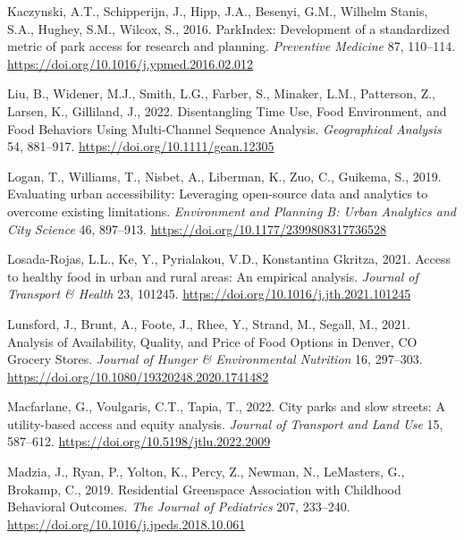 \documentclass[
  letterpaper,
  DIV=11,
  numbers=noendperiod]{scrreport}
\newlength{\cslhangindent}
\newlength{\cslentryspacingunit} %
\newenvironment{CSLReferences}[2] %
 {%
  \setlength{\parindent}{0pt}
  \ifodd #1
  \let\oldpar\par
  \def\par{\hangindent=\cslhangindent\oldpar}
  \fi
  \setlength{\parskip}{#2\cslentryspacingunit}
 }%
 {}
\begin{document}
\begin{CSLReferences}{1}{0}
\leavevmode{}%
Kaczynski, A.T., Schipperijn, J., Hipp, J.A., Besenyi, G.M., Wilhelm
Stanis, S.A., Hughey, S.M., Wilcox, S., 2016. {ParkIndex}: {Development}
of a standardized metric of park access for research and planning.
\emph{Preventive Medicine} 87, 110--114.
\url{https://doi.org/10.1016/j.ypmed.2016.02.012}

\leavevmode{}%
Liu, B., Widener, M.J., Smith, L.G., Farber, S., Minaker, L.M.,
Patterson, Z., Larsen, K., Gilliland, J., 2022. Disentangling {Time
Use}, {Food Environment}, and {Food Behaviors Using Multi-Channel
Sequence Analysis}. \emph{Geographical Analysis} 54, 881--917.
\url{https://doi.org/10.1111/gean.12305}

\leavevmode{}%
Logan, T., Williams, T., Nisbet, A., Liberman, K., Zuo, C., Guikema, S.,
2019. Evaluating urban accessibility: Leveraging open-source data and
analytics to overcome existing limitations. \emph{Environment and
Planning B: Urban Analytics and City Science} 46, 897--913.
\url{https://doi.org/10.1177/2399808317736528}

\leavevmode{}%
Losada-Rojas, L.L., Ke, Y., Pyrialakou, V.D., Konstantina Gkritza, 2021.
Access to healthy food in urban and rural areas: {An} empirical
analysis. \emph{Journal of Transport \& Health} 23, 101245.
\url{https://doi.org/10.1016/j.jth.2021.101245}

\leavevmode{}%
Lunsford, J., Brunt, A., Foote, J., Rhee, Y., Strand, M., Segall, M.,
2021. Analysis of {Availability}, {Quality}, and {Price} of {Food
Options} in {Denver}, {CO Grocery Stores}. \emph{Journal of Hunger \&
Environmental Nutrition} 16, 297--303.
\url{https://doi.org/10.1080/19320248.2020.1741482}

\leavevmode{}%
Macfarlane, G., Voulgaris, C.T., Tapia, T., 2022. City parks and slow
streets: {A} utility-based access and equity analysis. \emph{Journal of
Transport and Land Use} 15, 587--612.
\url{https://doi.org/10.5198/jtlu.2022.2009}

\leavevmode{}%
Madzia, J., Ryan, P., Yolton, K., Percy, Z., Newman, N., LeMasters, G.,
Brokamp, C., 2019. Residential {Greenspace Association} with {Childhood
Behavioral Outcomes}. \emph{The Journal of Pediatrics} 207, 233--240.
\url{https://doi.org/10.1016/j.jpeds.2018.10.061}


\end{CSLReferences}
\end{document}
